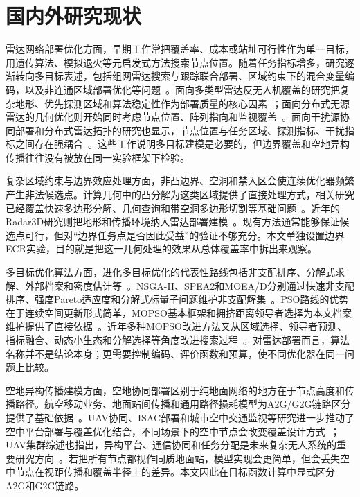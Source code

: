 \section{国内外研究现状}

雷达网络部署优化方面，早期工作常把覆盖率、成本或站址可行性作为单一目标，用遗传算法、模拟退火等元启发式方法搜索节点位置。随着任务指标增多，研究逐渐转向多目标表述，包括组网雷达搜索与跟踪联合部署、区域约束下的混合变量编码，以及非连通区域部署优化等问题~\cite{Yan2024,Han2025,MSRS2024}。面向多类型雷达反无人机覆盖的研究把复杂地形、优先探测区域和算法稳定性作为部署质量的核心因素~\cite{Ding2025UAVRadarDeployment}；面向分布式无源雷达的几何优化则开始同时考虑节点位置、阵列指向和监视覆盖~\cite{Tian2026PassiveRadarGeo}。面向干扰源协同部署和分布式雷达拓扑的研究也显示，节点位置与任务区域、探测指标、干扰指标之间存在强耦合~\cite{JammerDeploy2024,Cao2026NSMOPSO}。这些工作说明多目标建模是必要的，但边界覆盖和空地异构传播往往没有被放在同一实验框架下检验。

复杂区域约束与边界效应处理方面，非凸边界、空洞和禁入区会使连续优化器频繁产生非法候选点。计算几何中的凸分解为这类区域提供了直接处理方式，相关研究已经覆盖快速多边形分解、几何查询和带空洞多边形切割等基础问题~\cite{Hertel1983,DeBerg2008,Chazelle1982}。近年的Radar3D研究则把地形和传播环境纳入雷达部署建模~\cite{Radar3D2025}。现有方法通常能够保证候选点可行，但对“边界任务点是否因此受益”的验证不够充分。本文单独设置边界ECR实验，目的就是把这一几何处理的效果从总体覆盖率中拆出来观察。

多目标优化算法方面，进化多目标优化的代表性路线包括非支配排序、分解式求解、外部档案和密度估计等~\cite{Vachhani2015,Hua2021}。NSGA-II、SPEA2和MOEA/D分别通过快速非支配排序、强度Pareto适应度和分解式标量子问题维护非支配解集~\cite{Deb2002,Zitzler2001,Zhang2007}。PSO路线的优势在于连续空间更新形式简单，MOPSO基本框架和拥挤距离领导者选择为本文档案维护提供了直接依据~\cite{Coello2004,Raquel2005}。近年多种MOPSO改进方法又从区域选择、领导者预测、指标融合、动态小生态和分解选择等角度改进搜索过程~\cite{Liu2023,Wang2024,Zhang2024,Xu2024,Sun2024,Ma2025}。对雷达部署而言，算法名称并不是结论本身；更需要控制编码、评价函数和预算，使不同优化器在同一问题上比较。

空地异构传播建模方面，空地协同部署区别于纯地面网络的地方在于节点高度和传播路径。航空移动业务、地面站间传播和通用路径损耗模型为A2G/G2G链路区分提供了基础依据~\cite{ITUP528,ITUP452,Rappaport2002}。UAV协同、ISAC部署和城市空中交通监视等研究进一步推动了空中平台部署与覆盖优化结合，不同场景下的空中节点会改变覆盖设计方式~\cite{Li2025,Milone2024}；UAV集群综述也指出，异构平台、通信协同和任务分配是未来复杂无人系统的重要研究方向~\cite{Alqudsi2025UAVSwarms}。若把所有节点都视作同质地面站，模型实现会更简单，但会丢失空中节点在视距传播和覆盖半径上的差异。本文因此在目标函数计算中显式区分A2G和G2G链路。

